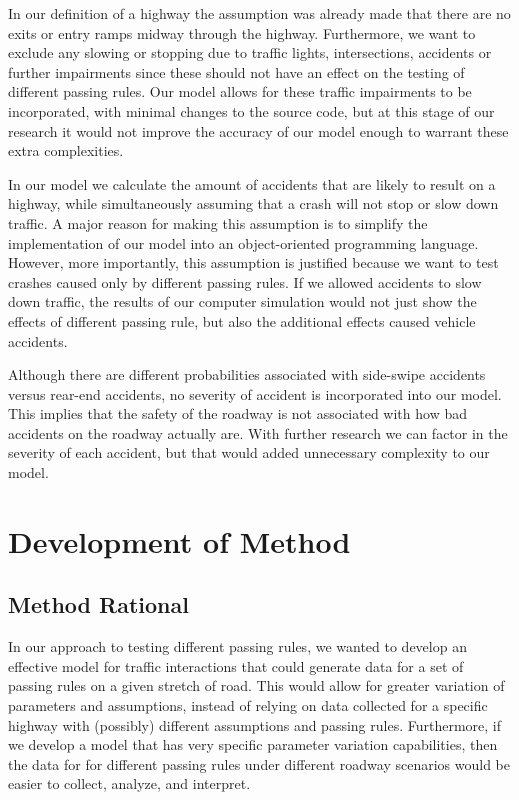 \documentclass{amsart}
\begin{document}
		 In our definition of a highway the assumption was already made that there are no exits or entry ramps midway through the highway. Furthermore, we want to exclude any slowing or stopping due to traffic lights, intersections, accidents or further impairments since these should not have an effect on the testing of different passing rules. Our model allows for these traffic impairments to be incorporated, with minimal changes to the source code, but at this stage of our research it would not improve the accuracy of our model enough to warrant these extra complexities. 

		In our model we calculate the amount of accidents that are likely to result on a highway, while simultaneously assuming that a crash will not stop or slow down traffic. A major reason for making this assumption is to simplify the implementation of our model into an object-oriented programming language. However, more importantly, this assumption is justified because we want to test crashes caused only by different passing rules. If we allowed accidents to slow down traffic, the results of our computer simulation would not just show the effects of different passing rule, but also the additional effects caused vehicle accidents.

	Although there are different probabilities associated with side-swipe accidents versus rear-end accidents, no severity of accident is incorporated into our model. This implies that the safety of the roadway is not associated with how bad accidents on the roadway actually are. With further research we can factor in the severity of each accident, but that would added unnecessary complexity to our model.
		
\section{\bfseries{Development of Method}}
	\subsection{Method Rational}
	In our approach to testing different passing rules, we wanted to develop an effective model for traffic interactions that could generate data for a set of passing rules on a given stretch of road. This would allow for greater variation of parameters and assumptions, instead of relying on data collected for a specific highway with (possibly) different assumptions and passing rules. Furthermore, if we develop a model that has very specific parameter variation capabilities, then the data for for different passing rules under different roadway scenarios would be easier to collect, analyze, and interpret. 
	
\end{document}
